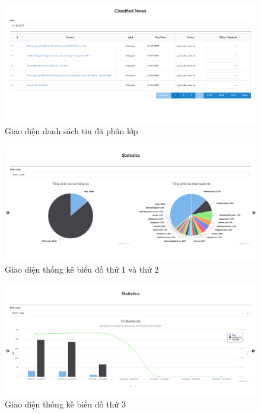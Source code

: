 \begin{figure}[H]
	\centering
	\includegraphics[width=1\linewidth]{Chapter3/Chapter3Figs/Classified.png}
	\caption{Giao diện danh sách tin đã phân lớp}
	\label{fig:streaming}
\end{figure}

\begin{figure}[H]
	\centering
	\includegraphics[width=0.96\linewidth]{Chapter3/Chapter3Figs/Chart1.png}
	\caption{Giao diện thống kê biểu đồ thứ 1 và thứ 2}
	\label{fig:streamingkeywords}
\end{figure}

\begin{figure}[H]
	\centering
	\includegraphics[width=0.96\linewidth]{Chapter3/Chapter3Figs/Chart2.png}
	\caption{Giao diện thống kê biểu đồ thứ 3}
	\label{fig:streamingkeywords}
\end{figure}

